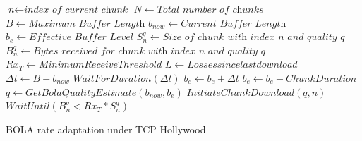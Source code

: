 \begin{algorithm}
	\begin{algorithmic}[1]
		\State $\textit{n} \gets \textit{index of current chunk}$
		\State $N \gets \textit{Total number of chunks}$
		\State $B \gets \textit{Maximum Buffer Length}$
		\State $b_{now} \gets \textit{Current Buffer Length}$
		\State $b_{e} \gets \textit{Effective Buffer Level}$
		\State $S_n^q \gets \textit{Size of chunk with index n and quality q}$
		\State $B_n^q  \gets \textit{Bytes received for chunk with index n and quality q }$
		\State $Rx_T \gets Minimum Receive Threshold$
		\State $L \gets Losses since last download$
				\State $\Delta t \gets B - b_{now}$
				\State $WaitForDuration (\Delta t)$
			\EndIf
			\State $b_{e} \gets b_{e} + \Delta t$
				\State $b_{e} \gets b_{e} - ChunkDuration$
			\EndIf
			\State ${q \gets GetBolaQualityEstimate(b_{now},  b_{e})}$		
			\State $InitiateChunkDownload(q, n)$
			\State $WaitUntil (B_n^q < Rx_T * S_n^q)$
		\EndWhile
		\EndProcedure
	\end{algorithmic}
	\caption{BOLA rate adaptation under TCP Hollywood}
	\label{algo:tcph_dash}
\end{algorithm}


